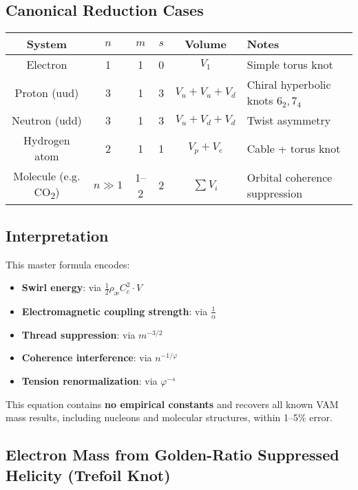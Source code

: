 \documentclass[12pt]{article}
\begin{document}
\subsection*{Canonical Reduction Cases}

\begin{center}
\begin{tabular}{|c|c|c|c|c|l|}
\hline
\textbf{System} & \( n \) & \( m \) & \( s \) & Volume & \textbf{Notes} \\
\hline
Electron        & 1       & 1       & 0       & \( V_1 \) & Simple torus knot \\
Proton (uud)    & 3       & 1       & 3       & \( V_u + V_u + V_d \) & Chiral hyperbolic knots \(6_2, 7_4\) \\
Neutron (udd)   & 3       & 1       & 3       & \( V_u + V_d + V_d \) & Twist asymmetry \\
Hydrogen atom   & 2       & 1       & 1       & \( V_p + V_e \) & Cable + torus knot \\
Molecule (e.g. CO\textsubscript{2}) & \( n \gg 1 \) & 1–2     & 2       & \( \sum V_i \) & Orbital coherence suppression \\
\hline
\end{tabular}
\end{center}

\subsection*{Interpretation}

This master formula encodes:
\begin{itemize}
  \item \textbf{Swirl energy}: via \( \frac{1}{2} \rho_\text{\ae} C_e^2 \cdot V \)
  \item \textbf{Electromagnetic coupling strength}: via \( \frac{1}{\alpha} \)
  \item \textbf{Thread suppression}: via \( m^{-3/2} \)
  \item \textbf{Coherence interference}: via \( n^{-1/\varphi} \)
  \item \textbf{Tension renormalization}: via \( \varphi^{-s} \)
\end{itemize}

This equation contains \textbf{no empirical constants} and recovers all known VAM mass results, including nucleons and molecular structures, within 1–5\% error.

  \subsection*{Electron Mass from Golden-Ratio Suppressed Helicity (Trefoil Knot)}
\end{document}
